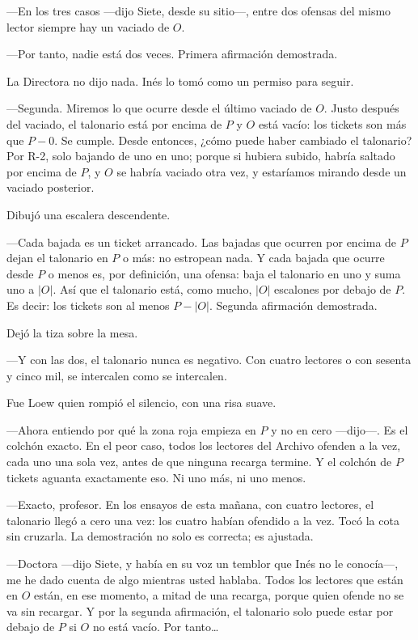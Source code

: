 ---En los tres casos ---dijo Siete, desde su sitio---\nobreak, entre dos ofensas del mismo lector siempre hay un vaciado de $O$.

---Por tanto, nadie está dos veces. Primera afirmación demostrada.

La Directora no dijo nada. Inés lo tomó como un permiso para seguir.

---Segunda. Miremos lo que ocurre desde el último vaciado de $O$. Justo después del vaciado, el talonario está por encima de $P$ y $O$ está vacío: los tickets son más que $P - 0$. Se cumple. Desde entonces, ¿cómo puede haber cambiado el talonario? Por R-2, solo bajando de uno en uno; porque si hubiera subido, habría saltado por encima de $P$, y $O$ se habría vaciado otra vez, y estaríamos mirando desde un vaciado posterior.

Dibujó una escalera descendente.

---Cada bajada es un ticket arrancado. Las bajadas que ocurren por encima de $P$ dejan el talonario en $P$ o más: no estropean nada. Y cada bajada que ocurre desde $P$ o menos es, por definición, una ofensa: baja el talonario en uno y suma uno a $|O|$. Así que el talonario está, como mucho, $|O|$ escalones por debajo de $P$. Es decir: los tickets son al menos $P - |O|$. Segunda afirmación demostrada.

Dejó la tiza sobre la mesa.

---Y con las dos, el talonario nunca es negativo. Con cuatro lectores o con sesenta y cinco mil, se intercalen como se intercalen.

\escena
Fue Loew quien rompió el silencio, con una risa suave.

---Ahora entiendo por qué la zona roja empieza en $P$ y no en cero ---dijo---\nobreak. Es el colchón exacto. En el peor caso, todos los lectores del Archivo ofenden a la vez, cada uno una sola vez, antes de que ninguna recarga termine. Y el colchón de $P$ tickets aguanta exactamente eso. Ni uno más, ni uno menos.

---Exacto, profesor. En los ensayos de esta mañana, con cuatro lectores, el talonario llegó a cero una vez: los cuatro habían ofendido a la vez. Tocó la cota sin cruzarla. La demostración no solo es correcta; es ajustada.

---Doctora ---dijo Siete, y había en su voz un temblor que Inés no le conocía---\nobreak, me he dado cuenta de algo mientras usted hablaba. Todos los lectores que están en $O$ están, en ese momento, a mitad de una recarga, porque quien ofende no se va sin recargar. Y por la segunda afirmación, el talonario solo puede estar por debajo de $P$ si $O$ no está vacío. Por tanto\ldots


